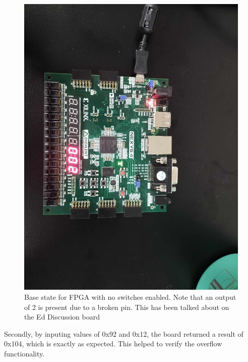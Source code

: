 \documentclass[12pt,a4paper]{article}
\begin{document}
\begin{figure}[H]
    \centering
    \includegraphics[scale=0.25]{images/fpga_base.jpg}
    \caption{Base state for FPGA with no switches enabled. Note that an output of 2 is present due to a broken pin. This has been talked about on the Ed Discussion board}
    \label{fig:fpga_base}
\end{figure}

Secondly, by inputing values of 0x92 and 0x12, the board returned a result of 0x104, which is exactly as expected. This helped to verify the overflow functionality.
\end{document}
